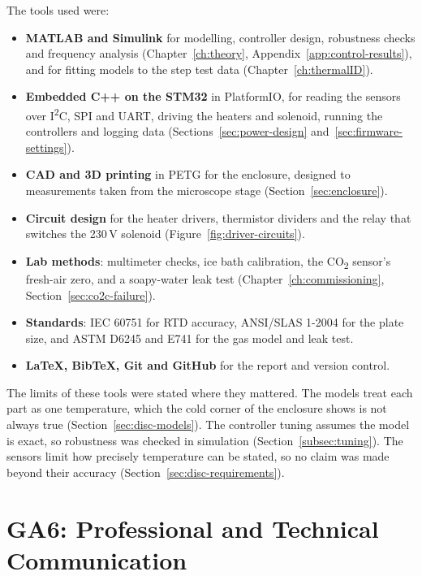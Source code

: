 The tools used were:

\begin{itemize}[nosep]
    \item \textbf{MATLAB and Simulink} for modelling, controller design, robustness checks and frequency analysis (Chapter~\ref{ch:theory}, Appendix~\ref{app:control-results}), and for fitting models to the step test data (Chapter~\ref{ch:thermalID}).
    \item \textbf{Embedded C++ on the STM32} in PlatformIO, for reading the sensors over I\textsuperscript{2}C, SPI and UART, driving the heaters and solenoid, running the controllers and logging data (Sections~\ref{sec:power-design} and~\ref{sec:firmware-settings}).
    \item \textbf{CAD and 3D printing} in PETG for the enclosure, designed to measurements taken from the microscope stage (Section~\ref{sec:enclosure}).
    \item \textbf{Circuit design} for the heater drivers, thermistor dividers and the relay that switches the 230\,V solenoid (Figure~\ref{fig:driver-circuits}).
    \item \textbf{Lab methods}: multimeter checks, ice bath calibration, the CO\textsubscript{2} sensor's fresh-air zero, and a soapy-water leak test (Chapter~\ref{ch:commissioning}, Section~\ref{sec:co2c-failure}).
    \item \textbf{Standards}: IEC 60751 for RTD accuracy, ANSI/SLAS 1-2004 for the plate size, and ASTM D6245 and E741 for the gas model and leak test.
    \item \textbf{\LaTeX, BibTeX, Git and GitHub} for the report and version control.
\end{itemize}

The limits of these tools were stated where they mattered. The models treat each part as one temperature, which the cold corner of the enclosure shows is not always true (Section~\ref{sec:disc-models}). The controller tuning assumes the model is exact, so robustness was checked in simulation (Section~\ref{subsec:tuning}). The sensors limit how precisely temperature can be stated, so no claim was made beyond their accuracy (Section~\ref{sec:disc-requirements}).

\section{GA6: Professional and Technical Communication}
\label{app:ga6}

